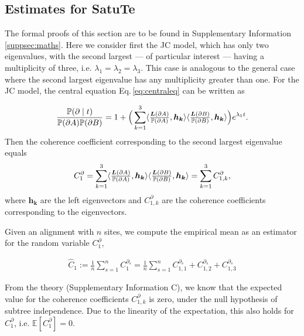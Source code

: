 \setlength{\parindent}{0pt}

\subsection{Estimates for SatuTe}\label{msec:estimates}

The formal proofs of this section are to be found in Supplementary Information \ref{suppsec:maths}. Here we consider first the JC model, which has only two eigenvalues, with the second largest — of particular interest — having a multiplicity of three, i.e. $\lambda_1=\lambda_2 =\lambda_3$. This case is analogous to the general case where the second largest eigenvalue has any multiplicity greater than one. For the JC model, the central equation Eq.\,\eqref{eq:centraleq} can be written as 

\begin{equation} \label{eq:likelihood_branch_at_site_t33} \frac{\mathbb{P}(\partial \mid t)}{\mathbb{P}({\partial A})\mathbb{P}({\partial B})} =  1 + \Big(\sum_{k=1}^3 \langle \tfrac{{ \bm{L}(\partial A) }}{\mathbb{P}({\partial A})},\bm{h_k}\rangle \langle \tfrac{{ \bm{L}(\partial B) }}{\mathbb{P}({\partial B})}, \bm{h_k}\rangle \Big) e^{\lambda_1 t}.
\end{equation}
Then the coherence coefficient corresponding to the second largest eigenvalue equals
\begin{align*}
    C_1^\partial =  \sum_{k=1}^3 \langle \tfrac{{ \bm{L}(\partial A) }}{\mathbb{P}({\partial A})},\bm{h_k}\rangle \langle \tfrac{{ \bm{L}(\partial B) }}{\mathbb{P}({\partial B})}, \bm{h_k}\rangle = \sum_{k=1}^3 C_{1,k}^\partial,
\end{align*} where $\bm{h_k}$ are the left eigenvectors and  $C_{1,k}^\partial$ are the coherence coefficients corresponding to the eigenvectors. 

\medskip

Given an alignment with $n$ sites, we compute the empirical mean as an estimator for the random variable $C_1^\partial$,

\begin{align} \label{eq:estimator_explicit}
    \hat C_1 := \frac{1}{n}\sum_{s=1}^n C_{1}^{\partial_s} = \frac{1}{n}\sum_{s=1}^n C_{1,1}^{\partial_s}+C_{1,2}^{\partial_s}+C_{1,3}^{\partial_s}
\end{align}

From the theory (Supplementary Information C), we know that the expected value for the coherence coefficients $C_{1,k}^\partial$ is zero, under the null hypothesis of subtree independence. Due to the linearity of the expectation, this also holds for $C_1^\partial$, i.e. $\mathbb{E}[C_1^\partial] = 0$.

